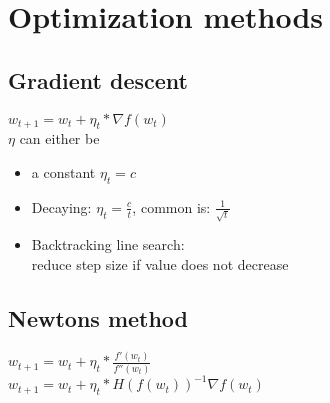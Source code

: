 \section{Optimization methods}
\subsection{Gradient descent}
$w_{t+1}= w_{t}+ \eta_{t}*\nabla f(w_{t})$\\ $\eta$ can either be\\
\begin{itemize}
	\item a constant $\eta_{t}= c$

	\item Decaying: $\eta_{t}= \frac{c}{t}$, common is: $\frac{1}{\sqrt{t}}$

	\item Backtracking line search:\\ reduce step size if value does not decrease
\end{itemize}
\subsection{Newtons method}
$w_{t+1}= w_{t}+ \eta_{t}*\frac{f'(w_{t})}{f''(w_{t})}$\\ $w_{t+1}= w_{t}+ \eta_{t}
*H(f(w_{t}))^{-1}\nabla f(w_{t})$\\